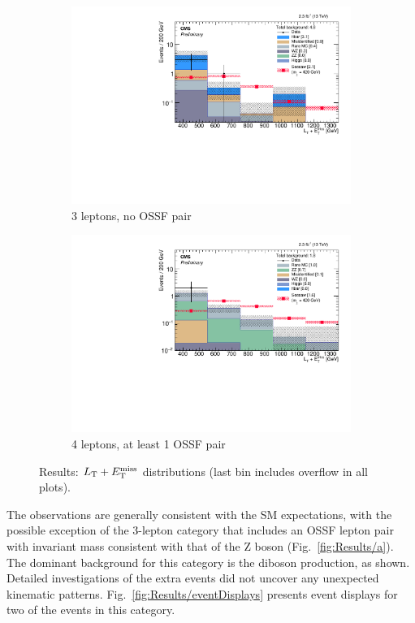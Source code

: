 \begin{figure}
\begin{center}
\begin{subfigure}[b]{.5\textwidth}
		\includegraphics[width=\textwidth]{Results/plots/L3DY0}
		\caption{3 leptons, no OSSF pair}
	\end{subfigure}%
	\begin{subfigure}[b]{.5\textwidth}
		\includegraphics[width=\textwidth]{Results/plots/L4DYgt0}
		\caption{4 leptons, at least 1 OSSF pair}
	\end{subfigure}%
	\caption{Results: $L_\textrm{T} + E_{\mathrm{T}}^{\text{miss}}$ distributions (last bin includes overflow in all plots).
	\label{fig:Results}}
\end{center}
\end{figure}

The observations are generally consistent with the SM expectations, with the possible exception of the 3-lepton category that includes an OSSF lepton pair with invariant mass consistent with that of the Z boson (Fig.~\ref{fig:Results/a}). The dominant background for this category is the \WZ diboson production, as shown. Detailed investigations of the extra events did not uncover any unexpected kinematic patterns. Fig.~\ref{fig:Results/eventDisplays} presents event displays for two of the events in this category.

